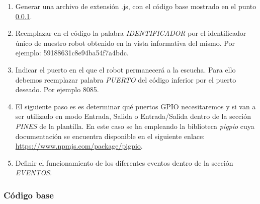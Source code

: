 \begin{enumerate}
  \item Generar una archivo de extensión .js, con el código base mostrado en el punto \ref{codigo:base}.
  \item Reemplazar en el código la palabra \emph{IDENTIFICADOR} por el identificador único de nuestro robot obtenido en la vista informativa del mismo.
  Por ejemplo: 59188631c8e94ba54f7a4bdc.
  \item Indicar el puerto en el que el robot permanecerá a la escucha. Para ello debemos reemplazar palabra \emph{PUERTO} del código inferior por el puerto deseado. Por ejemplo 8085. 
  \item El siguiente paso es es determinar qué puertos GPIO necesitaremos y si van a ser utilizado en modo Entrada, Salida o Entrada/Salida dentro de la sección \emph{PINES} de la plantilla.
  En este caso se ha empleando la biblioteca \emph{pigpio} cuya documentación se encuentra disponible en el siguiente enlace: \url{https://www.npmjs.com/package/pigpio}.
  \item Definir el funcionamiento de los diferentes eventos dentro de la sección \emph{EVENTOS}.
\end{enumerate}


\subsubsection{Código base}
\label{codigo:base}

